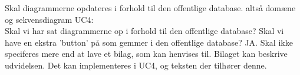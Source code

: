 Skal diagrammerne opdateres i forhold til den offentlige database. altså domæne og sekvensdiagram UC4:\\
Skal vi har sat diagrammerne op i forhold til den offentlige database? Skal vi have en ekstra 'button' på som gemmer i den offentlige database? JA. 
Skal ikke speciferes mere end at lave et bilag, som kan henvises til. Bilaget kan beskrive udvidelsen.
Det kan implementeres i UC4, og teksten der tilhører denne. 


 

